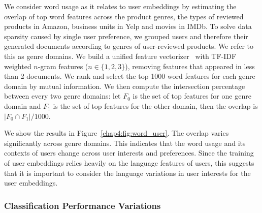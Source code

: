 We consider word usage as it relates to user embeddings by estimating the overlap of top word features across the product genres, the types of reviewed products in Amazon, business units in Yelp and movies in IMDb.
To solve data sparsity caused by single user preference, we grouped users and therefore their generated documents according to genres of user-reviewed products.
We refer to this as genre domains.
We build a unified feature vectorizer~\cite{pedregosa2011scikit} with TF-IDF weighted $n$-gram features ($n \in \{1,2,3\}$), removing features that appeared in less than 2 documents.
We rank and select the top 1000 word features for each genre domain by mutual information.
We then compute the intersection percentage between every two genre domains: let $F_0$ is the set of top features for one genre domain and $F_1$ is the set of top features for the other domain, then the overlap is $|F_0 \cap F_1|/1000$.

We show the results in Figure~\ref{chap4:fig:word_user}.
The overlap varies significantly across genre domains. 
This indicates that the word usage and its contexts of users change across user interests and preferences. 
Since the training of user embeddings relies heavily on the language features of users, this suggests that it is important to consider the language variations in user interests for the user embeddings.


\subsubsection{Classification Performance Variations}


